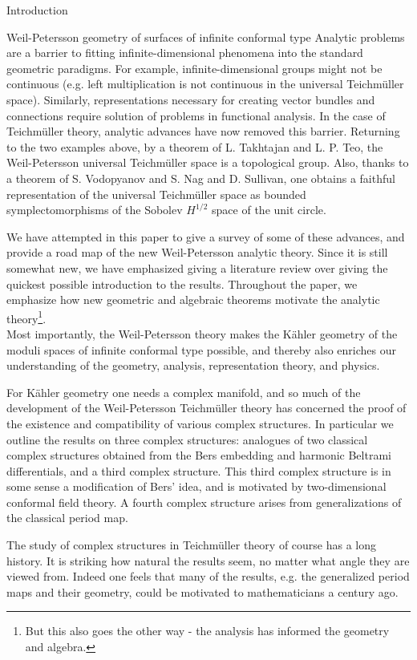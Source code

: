 \documentclass[12pt]{amsart}
\theoremstyle{plain}
\theoremstyle{definition}
\theoremstyle{remark}
\numberwithin{equation}{section} %
\numberwithin{figure}{section} %
\begin{document}
\begin{section}{Introduction}
\begin{subsection}{Weil-Petersson geometry of surfaces of infinite conformal type}
Analytic problems are a barrier to fitting infinite-dimensional phenomena into the standard geometric paradigms. For example, infinite-dimensional groups might not be continuous (e.g. left multiplication is not continuous in the universal Teichm\"uller space). Similarly, representations necessary for creating vector bundles and connections require solution of problems in functional analysis.   In the case of Teichm\"uller theory, analytic advances have now removed this barrier. Returning to the two examples above, by a theorem of L. Takhtajan and L. P. Teo, the Weil-Petersson universal Teichm\"uller space is a topological group. Also, thanks to a theorem of S. Vodopyanov and S. Nag and D. Sullivan, one obtains a faithful representation of the universal Teichm\"uller space as bounded symplectomorphisms of the Sobolev $H^{1/2}$ space of the unit circle.  


We have attempted in this paper to give a survey of some of these advances, and provide a road map of the new Weil-Petersson analytic theory. Since it is still somewhat new, we have emphasized giving a literature review over giving the quickest possible introduction to the results.  Throughout the paper, we emphasize how new geometric and algebraic theorems motivate the analytic theory\footnote{But this also goes the other way - the analysis has informed the geometry and algebra.}.    \\

Most importantly, the Weil-Petersson theory makes the K\"ahler geometry of the moduli spaces of infinite conformal type possible, and thereby also enriches our understanding of the geometry, analysis, representation theory, and physics.  

For K\"ahler geometry one needs a complex manifold, and so much of the development of the Weil-Petersson Teichm\"uller theory has concerned the proof of the existence and compatibility of various complex structures. In particular we outline the results on three complex structures: analogues of two classical complex structures obtained from the Bers embedding and harmonic Beltrami differentials, and a third complex structure. This third complex structure is in some sense a modification of Bers' idea, and is motivated by two-dimensional conformal field theory.  A fourth complex structure arises from generalizations of the classical period map. 

The study of complex structures in Teichm\"uller theory of course has a long history. It is striking how natural the results seem, no matter what angle they are viewed from. Indeed one feels that many of the results, e.g. the generalized period maps and their geometry, could be motivated to mathematicians a century ago. \\ 



\end{subsection}
\end{section}
\end{document}
